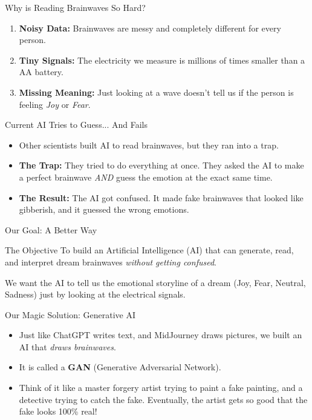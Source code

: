 \documentclass[11pt, aspectratio=169]{beamer}
\begin{document}
\begin{frame}{Why is Reading Brainwaves So Hard?}
    \begin{enumerate}
        \item \textbf{Noisy Data:} Brainwaves are messy and completely different for every person.
        \item \textbf{Tiny Signals:} The electricity we measure is millions of times smaller than a AA battery.
        \item \textbf{Missing Meaning:} Just looking at a wave doesn't tell us if the person is feeling \textit{Joy} or \textit{Fear}.
    \end{enumerate}
\end{frame}

\begin{frame}{Current AI Tries to Guess... And Fails}
    \begin{itemize}
        \item Other scientists built AI to read brainwaves, but they ran into a trap.
        \item \textbf{The Trap:} They tried to do everything at once. They asked the AI to make a perfect brainwave \textit{AND} guess the emotion at the exact same time.
        \item \textbf{The Result:} The AI got confused. It made fake brainwaves that looked like gibberish, and it guessed the wrong emotions.
    \end{itemize}
\end{frame}

\begin{frame}{Our Goal: A Better Way}
    \begin{block}{The Objective}
    To build an Artificial Intelligence (AI) that can generate, read, and interpret dream brainwaves \textit{without getting confused}.
    \end{block}
    \vspace{0.2cm}
    We want the AI to tell us the emotional storyline of a dream (Joy, Fear, Neutral, Sadness) just by looking at the electrical signals.
\end{frame}

\begin{frame}{Our Magic Solution: Generative AI}
    \begin{itemize}
        \item Just like ChatGPT writes text, and MidJourney draws pictures, we built an AI that \textit{draws brainwaves}.
        \item It is called a \textbf{GAN} (Generative Adversarial Network).
        \item Think of it like a master forgery artist trying to paint a fake painting, and a detective trying to catch the fake. Eventually, the artist gets so good that the fake looks 100\% real!
    \end{itemize}
\end{frame}
\end{document}
